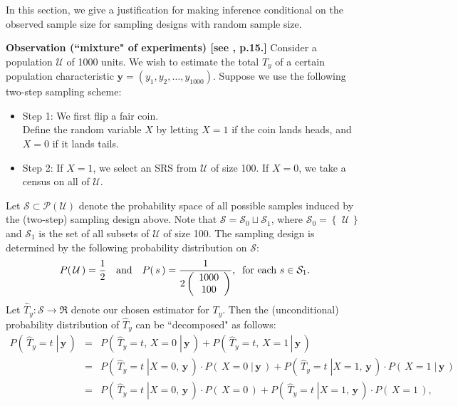 \documentclass{article}
\begin{document}
In this section, we give a justification for making inference conditional on the observed sample size
for sampling designs with random sample size.

\vskip 0.5cm
\noindent
\textbf{Observation (``mixture" of experiments) [see \cite{Valliant2000}, p.15.]}\vskip 0.1cm
\noindent
Consider a population $\mathcal{U}$ of 1000 units.
We wish to estimate the total $T_{y}$ of a certain population characteristic $\mathbf{y} = (y_{1},y_{2},\ldots,y_{1000})$.
Suppose we use the following two-step sampling scheme:
\begin{itemize}
\item	Step 1: We first flip a fair coin.\\
		Define the random variable $X$ by letting $X = 1$ if the coin lands heads, and $X = 0$ if it lands tails.
\item	Step 2: If $X = 1$, we select an SRS from $\mathcal{U}$ of size 100. If $X = 0$, we take a census on all of $\mathcal{U}$.
\end{itemize}
Let $\mathcal{S} \subset \mathcal{P}(\mathcal{U})$ denote the probability space of all
possible samples induced by the (two-step) sampling design above.
Note that $\mathcal{S} = \mathcal{S}_{0} \sqcup \mathcal{S}_{1}$,
where $\mathcal{S}_{0} = \left\{\,\,\mathcal{U}\,\right\}$ and
$\mathcal{S}_{1}$ is the set of all subsets of $\mathcal{U}$ of size 100.
The sampling design is determined by the following probability distribution on $\mathcal{S}$:
\begin{equation*}
P\!\left(\,\mathcal{U}\,\right) = \dfrac{1}{2}
\quad\textnormal{and}\quad
P\!\left(\,s\,\right) = \frac{1}{2\left(\begin{array}{c}1000\\100\end{array}\right)},
\;\;\textnormal{for each $s \in \mathcal{S}_{1}$}.
\end{equation*}
Let $\widehat{T}_{y}:\mathcal{S} \longrightarrow \Re$ denote our chosen estimator for $T_{y}$.
Then the (unconditional) probability distribution of $\widehat{T}_{y}$ can be ``decomposed" as follows:
\begin{eqnarray*}
P\left(\,\left.\widehat{T}_{y} = t\;\right\vert\,\mathbf{y}\,\right)
&=& P\left(\,\left.\widehat{T}_{y} = t,\,X = 0\;\right\vert\,\mathbf{y}\,\right) + P\left(\,\left.\widehat{T}_{y} = t,\,X = 1\,\right\vert\,\mathbf{y}\,\right) \\
&=& P\left(\,\left.\widehat{T}_{y} = t\;\right\vert X = 0,\,\mathbf{y}\,\right)\cdot P\left(\,\left.X = 0\;\right\vert\,\mathbf{y}\,\right)
	+ P\left(\,\left.\widehat{T}_{y} = t\;\right\vert X = 1,\,\mathbf{y}\,\right)\cdot P\left(\,\left.X = 1\;\right\vert\,\mathbf{y}\,\right) \\
&=& P\left(\,\left.\widehat{T}_{y} = t\;\right\vert X = 0,\,\mathbf{y}\,\right)\cdot P\left(\,X = 0\,\right)
	+ P\left(\,\left.\widehat{T}_{y} = t\;\right\vert X = 1,\,\mathbf{y}\,\right)\cdot P\left(\,X = 1\,\right),
\end{eqnarray*}
\end{document}
